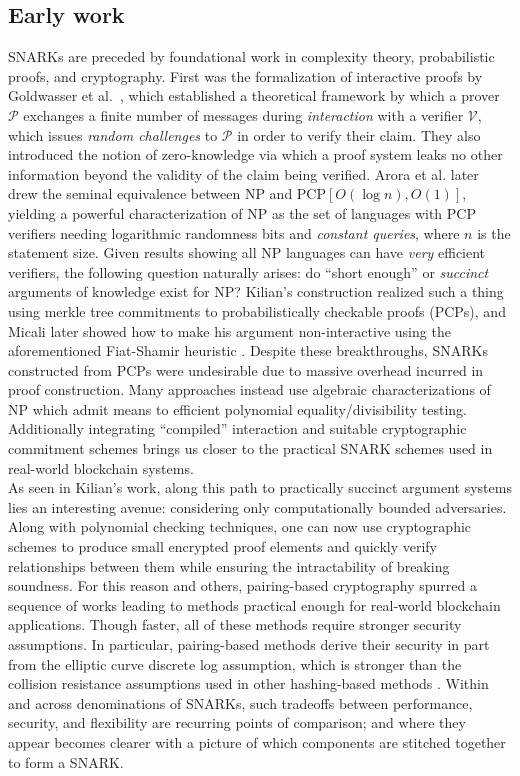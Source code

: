 \subsection{Early work}
\noindent SNARKs are preceded by foundational work in complexity theory, probabilistic proofs, and cryptography. First was the formalization of interactive proofs by Goldwasser et al.\ \cite{ipfirst}, which established a theoretical framework by which a prover $\mathcal{P}$ exchanges a finite number of messages during \textit{interaction} with a verifier $\mathcal{V}$, which issues \textit{random challenges} to $\mathcal{P}$ in order to verify their claim. They also introduced the notion of zero-knowledge via which a proof system leaks no other information beyond the validity of the claim being verified. Arora et al. \cite{pcpthm1, pcpthm2} later drew the seminal equivalence between NP and PCP$[O(\log n), O(1)]$, yielding a powerful characterization of NP as the set of languages with PCP verifiers needing logarithmic randomness bits and \textit{constant queries}, where $n$ is the statement size. Given results showing all NP languages can have \textit{very} efficient verifiers, the following question naturally arises: do ``short enough'' or \textit{succinct} arguments of knowledge exist for NP? Kilian's construction \cite{kilian} realized such a thing using merkle tree commitments to probabilistically checkable proofs (PCPs), and Micali later showed how to make his argument non-interactive \cite{micalisnark} using the aforementioned Fiat-Shamir heuristic \cite{fiatshamir}. Despite these breakthroughs, SNARKs constructed from PCPs were undesirable due to massive overhead incurred in proof construction. Many approaches instead use algebraic characterizations of NP which admit means to efficient polynomial equality/divisibility testing. Additionally integrating ``compiled'' interaction and suitable cryptographic commitment schemes brings us closer to the practical SNARK schemes used in real-world blockchain systems.\\

\noindent As seen in Kilian's work, along this path to practically succinct argument systems lies an interesting avenue: considering only computationally bounded adversaries. Along with polynomial checking techniques, one can now use cryptographic schemes to produce small encrypted proof elements and quickly verify relationships between them while ensuring the intractability of breaking soundness. For this reason and others, pairing-based cryptography spurred a sequence of works leading to methods practical enough for real-world blockchain applications. Though faster, all of these methods require stronger security assumptions. In particular, pairing-based methods derive their security in part from the elliptic curve discrete log assumption, which is stronger than the collision resistance assumptions used in other hashing-based methods \cite{starks, ligero, hyrax, aurora}. Within and across denominations of SNARKs, such tradeoffs between performance, security, and flexibility are recurring points of comparison; and where they appear becomes clearer with a picture of which components are stitched together to form a SNARK.


